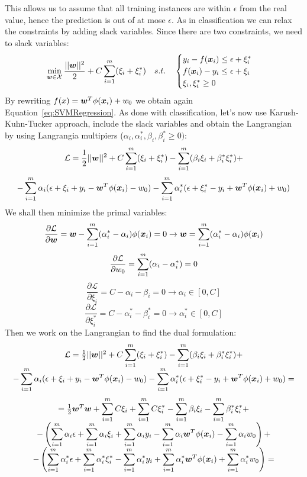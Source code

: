 This allows us to assume that all training instances are within $\epsilon$ from the real value, hence the prediction is out of at mose $\epsilon$. \newline
As in classification we can relax the constraints by adding slack variables. Since there are two constraints, we need to slack variables:
\[\min\limits_{\bm{w}\in\mathcal{X}}\frac{\vert\vert\bm{w}\vert\vert^2}{2}+C\displaystyle\sum_{i=1}^m(\xi_i+\xi^*_i)\quad s.t.\quad 
\begin{cases}
  y_i-f(\bm{x}_i)\leq \epsilon+\xi^*_i\\
  f(\bm{x}_i)-y_i\leq \epsilon+\xi_i\\
  \xi_i,\xi_i^*\geq0 
\end{cases}
\]
By rewriting $f(x)=\bm{w}^T\phi(\bm{x}_i)+w_0$ we obtain again Equation~\ref{eq:SVMRegression}. \newline
As done with classification, let's now use Karush-Kuhn-Tucker approach, include the slack variables and obtain the Langrangian by using Langrangia multipiers ($\alpha_i,\alpha_i^*,\beta_i,\beta_i^*\geq 0)$:\[
  \mathcal{L}=\frac{1}{2}\vert\vert\bm{w}\vert\vert^2+C\displaystyle\sum_{i=1}^m(\xi_i+\xi_i^*)-\displaystyle\sum_{i=1}^m(\beta_i\xi_i+\beta_i^*\xi_i^*)+\]\[
  -\displaystyle\sum_{i=1}^m\alpha_i(\epsilon+\xi_i+y_i-\bm{w}^T\phi(\bm{x}_i)-w_0)-\displaystyle\sum_{i=1}^m\alpha_i^*(\epsilon+\xi_i^*-y_i+\bm{w}^T\phi(\bm{x}_i)+w_0)
\]
We shall then minimize the primal variables:
\[\frac{\partial\mathcal{L}}{\partial\bm{w}}=\bm{w}-\displaystyle\sum_{i=1}^m(\alpha_i^*-\alpha_i)\phi(\bm{x}_i)=0\rightarrow\bm{w}=\displaystyle\sum_{i=1}^m(\alpha_i^*-\alpha_i)\phi(\bm{x}_i)\]
\[\frac{\partial\mathcal{L}}{\partial w_0}=\displaystyle\sum_{i=1}^m(\alpha_i-\alpha_i^*)=0\]
\[\frac{\partial\mathcal{L}}{\partial\xi_i}=C-\alpha_i-\beta_i=0\rightarrow\alpha_i\in[0,C]\]
\[\frac{\partial\mathcal{L}}{\partial\xi_i^*}=C-\alpha_i^*-\beta_i^*=0\rightarrow\alpha_i^*\in[0,C]\]
Then we work on the Langrangian to find the dual formulation:
\[
  \begin{array}{c}
    \mathcal{L}=\frac{1}{2}\vert\vert\bm{w}\vert\vert^2+C\displaystyle\sum_{i=1}^m(\xi_i+\xi_i^*)-\displaystyle\sum_{i=1}^m(\beta_i\xi_i+\beta_i^*\xi_i^*)+\\
    -\displaystyle\sum_{i=1}^m\alpha_i(\epsilon+\xi_i+y_i-\bm{w}^T\phi(\bm{x}_i)-w_0)-\displaystyle\sum_{i=1}^m\alpha_i^*(\epsilon+\xi_i^*-y_i+\bm{w}^T\phi(\bm{x}_i)+w_0)=
  \end{array}
\]
\[
  \begin{array}{c}
    =\frac{1}{2}\bm{w}^T\bm{w}+\displaystyle\sum_{i=1}^mC\xi_i+\displaystyle\sum_{i=1}^mC\xi_i^*-\displaystyle\sum_{i=1}^m\beta_i\xi_i-\displaystyle\sum_{i=1}^m\beta_i^*\xi_i^*+\\
    -\left(\displaystyle\sum_{i=1}^m\alpha_i\epsilon +\displaystyle\sum_{i=1}^m\alpha_i\xi_i+\displaystyle\sum_{i=1}^m\alpha_iy_i-\displaystyle\sum_{i=1}^m\alpha_i\bm{w}^T\phi(\bm{x}_i)-\displaystyle\sum_{i=1}^m\alpha_iw_0\right)+\\
    -\left(\displaystyle\sum_{i=1}^m\alpha_i^*\epsilon +\displaystyle\sum_{i=1}^m\alpha_i^*\xi_i^*-\displaystyle\sum_{i=1}^m\alpha_i^*y_i+\displaystyle\sum_{i=1}^m\alpha_i^*\bm{w}^T\phi(\bm{x}_i)+\displaystyle\sum_{i=1}^m\alpha_i^*w_0\right)=\\
  \end{array}
\]

